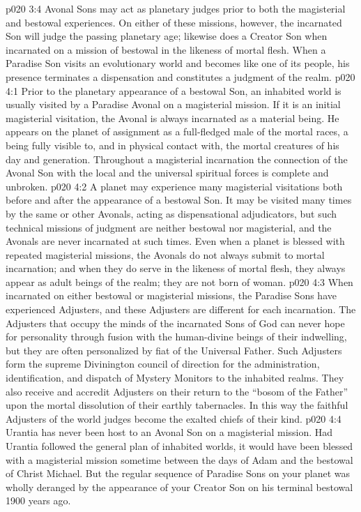 \vs p020 3:4 Avonal Sons may act as planetary judges prior to both the magisterial and bestowal experiences. On either of these missions, however, the incarnated Son will judge the passing planetary age; likewise does a Creator Son when incarnated on a mission of bestowal in the likeness of mortal flesh. When a Paradise Son visits an evolutionary world and becomes like one of its people, his presence terminates a dispensation and constitutes a judgment of the realm.
\vs p020 4:1 Prior to the planetary appearance of a bestowal Son, an inhabited world is usually visited by a Paradise Avonal on a magisterial mission. If it is an initial magisterial visitation, the Avonal is always incarnated as a material being. He appears on the planet of assignment as a full\hyp{}fledged male of the mortal races, a being fully visible to, and in physical contact with, the mortal creatures of his day and generation. Throughout a magisterial incarnation the connection of the Avonal Son with the local and the universal spiritual forces is complete and unbroken.
\vs p020 4:2 A planet may experience many magisterial visitations both before and after the appearance of a bestowal Son. It may be visited many times by the same or other Avonals, acting as dispensational adjudicators, but such technical missions of judgment are neither bestowal nor magisterial, and the Avonals are never incarnated at such times. Even when a planet is blessed with repeated magisterial missions, the Avonals do not always submit to mortal incarnation; and when they do serve in the likeness of mortal flesh, they always appear as adult beings of the realm; they are not born of woman.
\vs p020 4:3 When incarnated on either bestowal or magisterial missions, the Paradise Sons have experienced Adjusters, and these Adjusters are different for each incarnation. The Adjusters that occupy the minds of the incarnated Sons of God can never hope for personality through fusion with the human\hyp{}divine beings of their indwelling, but they are often personalized by fiat of the Universal Father. Such Adjusters form the supreme Divinington council of direction for the administration, identification, and dispatch of Mystery Monitors to the inhabited realms. They also receive and accredit Adjusters on their return to the “bosom of the Father” upon the mortal dissolution of their earthly tabernacles. In this way the faithful Adjusters of the world judges become the exalted chiefs of their kind.
\vs p020 4:4 \pc Urantia has never been host to an Avonal Son on a magisterial mission. Had Urantia followed the general plan of inhabited worlds, it would have been blessed with a magisterial mission sometime between the days of Adam and the bestowal of Christ Michael. But the regular sequence of Paradise Sons on your planet was wholly deranged by the appearance of your Creator Son on his terminal bestowal 1900 years ago.
